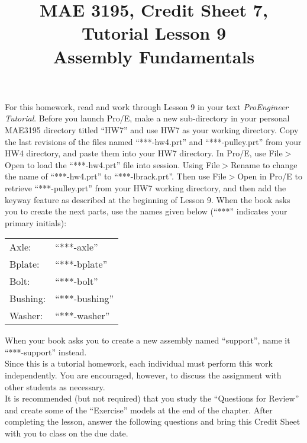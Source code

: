 \documentclass[12pt]{article}
\title{MAE 3195, Credit Sheet 7, Tutorial Lesson 9\\
Assembly Fundamentals}
\date{}
\begin{document}
\maketitle

For this homework, read and work through Lesson 9 in your text \textit{ProEngineer Tutorial}. Before you launch Pro/E, make a new sub-directory in your personal MAE3195 directory titled ``HW7'' and use HW7 as your working directory. Copy the last revisions of the files named ``***-hw4.prt'' and ``***-pulley.prt'' from your HW4 directory, and paste them into your HW7 directory. In Pro/E, use File$>$Open to load the ``***-hw4.prt'' file into session. Using File$>$Rename to change the name of ``***-hw4.prt'' to ``***-lbrack.prt''. Then use File$>$Open in Pro/E to retrieve ``***-pulley.prt'' from your HW7 working directory, and then add the keyway feature as described at the beginning of Lesson 9. When the book asks you to create the next parts, use the names given below (``***'' indicates your primary initials):\\

\begin{tabular}[t]{ll} 
	Axle: & ``***-axle''\\
	Bplate: & ``***-bplate''\\
	Bolt: & ``***-bolt''\\
	Bushing: & ``***-bushing''\\
	Washer: & ``***-washer''
\end{tabular}

\vspace{0.25in}
When your book asks you to create a new assembly named ``support'', name it ``***-support'' instead.\\

Since this is a tutorial homework, each individual must perform this work independently. You are encouraged, however, to discuss the assignment with other students as necessary.\\

It is recommended (but not required) that you study the ``Questions for Review'' and create some of the ``Exercise'' models at the end of the chapter. After completing the lesson, answer the following questions and bring this Credit Sheet with you to class on the due date.

\pagebreak
\end{document}
